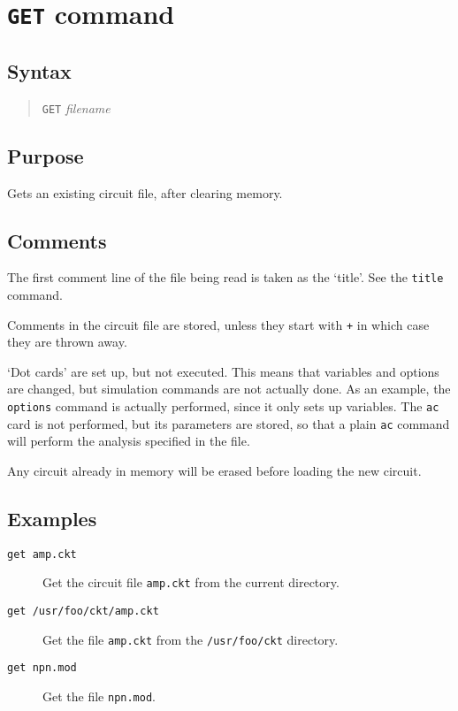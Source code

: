 \section{{\tt GET} command}
\subsection{Syntax}
\begin{verse}
{\tt GET} {\it filename}
\end{verse}
\subsection{Purpose}

Gets an existing circuit file, after clearing memory.
\subsection{Comments}

The first comment line of the file being read is taken as the `title'.  See
the {\tt title} command.

Comments in the circuit file are stored, unless they start with {\tt *+} in
which case they are thrown away.

`Dot cards' are set up, but not executed.  This means that variables and
options are changed, but simulation commands are not actually done.  As
an example, the {\tt options} command is actually performed, since it only
sets up variables.  The {\tt ac} card is not performed, but its parameters
are stored, so that a plain {\tt ac} command will perform the analysis
specified in the file.

Any circuit already in memory will be erased before loading the new circuit.
\subsection{Examples}

\begin{description}

\item[{\tt get amp.ckt}] Get the circuit file {\tt amp.ckt} from
the current directory.

\item[{\tt get /usr/foo/ckt/amp.ckt}] Get the file {\tt amp.ckt}
from the {\tt /usr/foo/ckt} directory.

\item[{\tt get npn.mod}] Get the file {\tt npn.mod}.
\end{description}
